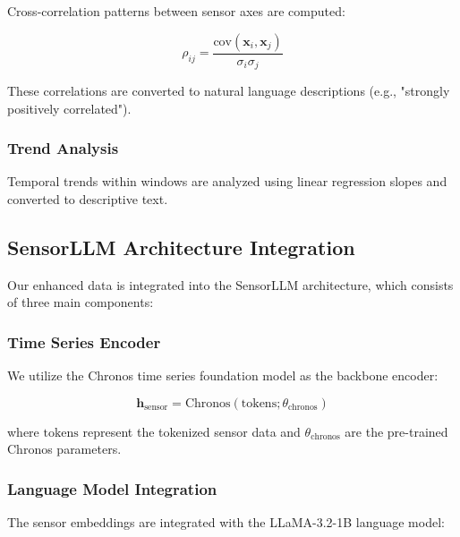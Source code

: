 \hspace{2em}Cross-correlation patterns between sensor axes are computed:

\begin{equation}
\rho_{ij} = \frac{\text{cov}(\mathbf{x}_i, \mathbf{x}_j)}{\sigma_i \sigma_j}
\end{equation}

These correlations are converted to natural language descriptions (e.g., "strongly positively correlated").

\subsubsection{Trend Analysis}

\hspace{2em}Temporal trends within windows are analyzed using linear regression slopes and converted to descriptive text.

\subsection{SensorLLM Architecture Integration}

\hspace{2em}Our enhanced data is integrated into the SensorLLM architecture, which consists of three main components:

\subsubsection{Time Series Encoder}

\hspace{2em}We utilize the Chronos time series foundation model as the backbone encoder:

\begin{equation}
\mathbf{h}_{\text{sensor}} = \text{Chronos}(\text{tokens}; \theta_{\text{chronos}})
\end{equation}

where $\text{tokens}$ represent the tokenized sensor data and $\theta_{\text{chronos}}$ are the pre-trained Chronos parameters.

\subsubsection{Language Model Integration}

\hspace{2em}The sensor embeddings are integrated with the LLaMA-3.2-1B language model:

